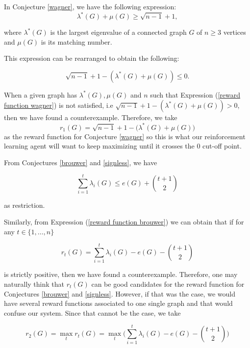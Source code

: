 \documentclass[11pt]{article}
\theoremstyle{definition}
\begin{document}
In Conjecture \ref{wagner}, we have the following expression:
\begin{equation*}
    \lambda^*(G) + \mu(G) \geq \sqrt{n-1} +1, 
\end{equation*}

where $\lambda^*(G)$ is the largest eigenvalue of a connected graph $G$ of $n \geq 3$ vertices and $\mu(G)$ is its matching number.

This expression can be rearranged to obtain the following:

\begin{equation} \label{reward function wagner}
    \sqrt{n-1} + 1 - (\lambda^*(G) + \mu(G)) \leq 0.
\end{equation}

When a given graph has $\lambda^*(G), \mu(G)$ and $n$ such that Expression (\ref{reward function wagner}) is not satisfied, i.e $\sqrt{n-1} + 1 - (\lambda^*(G) + \mu(G)) > 0$, then we have found a counterexample. Therefore, we take 
\begin{equation} \label{r1}
    r_1(G) = \sqrt{n-1} + 1 - \big(\lambda^*(G) + \mu(G)\big)
\end{equation}
as the reward function for Conjecture \ref{wagner} so this is what our reinforcement learning agent will want to keep maximizing until it crosses the 0 cut-off point. 

From Conjectures \ref{brouwer} and \ref{signless}, we have

\begin{equation} \label{reward function brouwer}
    \sum_{i=1}^{t} \lambda_i(G) \leq e(G) + {t+1 \choose 2}
\end{equation}

as restriction.

Similarly, from Expression (\ref{reward function brouwer}) we can obtain that if for any $t \in \{1,\ldots, n\}$

\begin{equation*}
    r_t(G) = \sum_{i=1}^{t} \lambda_i(G) - e(G) - {t+1 \choose 2}
\end{equation*}

is strictly positive, then we have found a counterexample. Therefore, one may naturally think that $r_t(G)$ can be good candidates for the reward function for Conjectures \ref{brouwer} and \ref{signless}. However, if that was the case, we would have several reward functions associated to one single graph and that would confuse our system. Since that cannot be the case, we take

\begin{equation*}
    r_2(G) = \max_t r_t(G) = \max_t \Big( \sum_{i=1}^{t} \lambda_i(G) - e(G) - {t+1 \choose 2} \Big)
\end{equation*}
\end{document}
